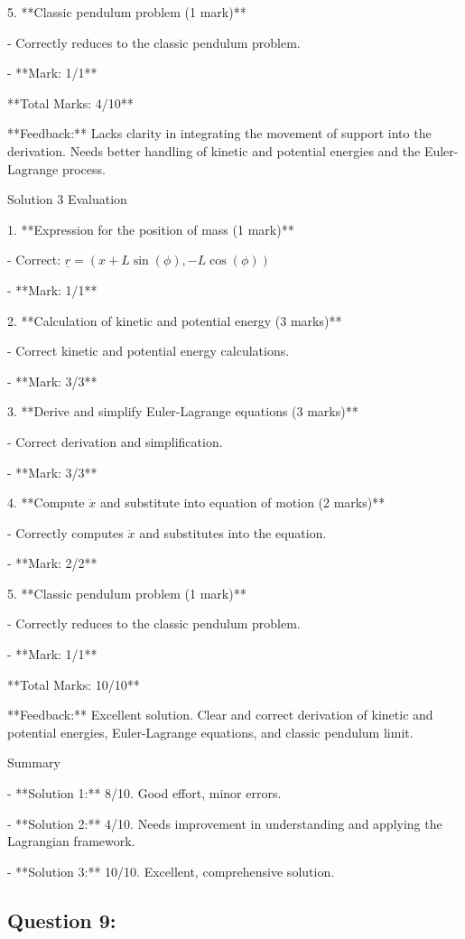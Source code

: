 \documentclass[a4paper,11pt]{article}
\begin{document}
5. **Classic pendulum problem (1 mark)**

   - Correctly reduces to the classic pendulum problem.
   
   - **Mark: 1/1**

**Total Marks: 4/10**

**Feedback:** Lacks clarity in integrating the movement of support into the derivation. Needs better handling of kinetic and potential energies and the Euler-Lagrange process.

Solution 3 Evaluation

1. **Expression for the position of mass (1 mark)**

   - Correct: \( \underline{r} = (x + L \sin(\phi), -L \cos(\phi)) \)
   
   - **Mark: 1/1**

2. **Calculation of kinetic and potential energy (3 marks)**

   - Correct kinetic and potential energy calculations.
   
   - **Mark: 3/3**

3. **Derive and simplify Euler-Lagrange equations (3 marks)**

   - Correct derivation and simplification.
   
   - **Mark: 3/3**

4. **Compute \( \ddot{x} \) and substitute into equation of motion (2 marks)**

   - Correctly computes \( \ddot{x} \) and substitutes into the equation.
   
   - **Mark: 2/2**

5. **Classic pendulum problem (1 mark)**

   - Correctly reduces to the classic pendulum problem.
   
   - **Mark: 1/1**

**Total Marks: 10/10**

**Feedback:** Excellent solution. Clear and correct derivation of kinetic and potential energies, Euler-Lagrange equations, and classic pendulum limit.

Summary

- **Solution 1:** 8/10. Good effort, minor errors.

- **Solution 2:** 4/10. Needs improvement in understanding and applying the Lagrangian framework.

- **Solution 3:** 10/10. Excellent, comprehensive solution.


\subsection*{Question 9:}
\end{document}

